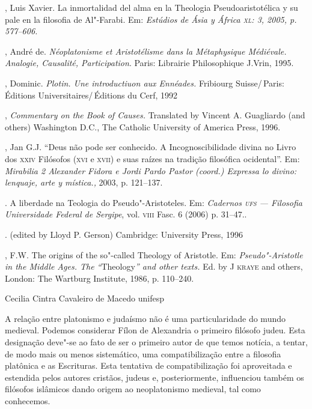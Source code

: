 \begin{description}
, Luis Xavier. La inmortalidad del alma en la
Theologia Pseudoaristotélica y su pale en la filosofia de
Al"-Farabi. Em: \emph{Estúdios de Ásia y África \textsc{xl}: 3, 2005, p.
577--606.}

, André de. \emph{Néoplatonisme et Aristotélisme dans la
Métaphysique Médiévale. Analogie, Causalité, Participation}.
Paris: Librairie Philosophique J.Vrin, 1995.

, Dominic. \emph{Plotin. Une introductiuon aux Ennéades.}
Fribiourg Suisse/\,Paris: Éditions Universitaires/\,Éditions du
Cerf, 1992

, \emph{Commentary on the Book of Causes.}
Translated by Vincent A. Guagliardo (and others) Washington
D.C., The Catholic University of America Press, 1996.

, Jan G.J. ``Deus não pode ser conhecido. A
Incognoscibilidade divina no Livro dos \textsc{xxiv} Filósofos
(\textsc{xvi} e
\textsc{xvii}) e suas raízes na tradição filosófica ocidental''. Em:
\emph{Mirabilia 2 Alexander Fidora e Jordi Pardo Pastor
(coord.) Expressa lo divino: lenquaje, arte y mística.,} 2003,
p. 121--137.

\titidem.  A liberdade na Teologia do Pseudo"-Aristoteles. Em:
\emph{Cadernos \textsc{ufs} --- Filosofia Universidade Federal de
Sergipe}, vol. \textsc{viii} Fasc. 6 (2006) p. 31--47.. 

. (edited by Lloyd P. Gerson)
Cambridge: University Press, 1996

, F.W. The origins of the so"-called Theology of
Aristotle. Em: \emph{Pseudo"-Aristotle in the Middle Ages. The
“}Theology\emph{” and other texts.} Ed. by J \textsc{kraye} and others,
London: The Wartburg Institute, 1986, p. 110--240.
\end{description}



%
	 {Cecilia Cintra Cavaleiro de Macedo}
	 {unifesp}


A relação entre platonismo e judaísmo não é uma particularidade do
mundo medieval. Podemos considerar Fílon de Alexandria o primeiro
filósofo judeu. Esta designação deve"-se ao fato de ser o primeiro
autor de que temos notícia, a tentar, de modo mais ou menos
sistemático, uma compatibilização entre a filosofia platônica e as
Escrituras. Esta tentativa de compatibilização foi aproveitada e
estendida pelos autores cristãos, judeus e, posteriormente,
influenciou também os filósofos islâmicos dando origem ao
neoplatonismo medieval, tal como conhecemos. 

